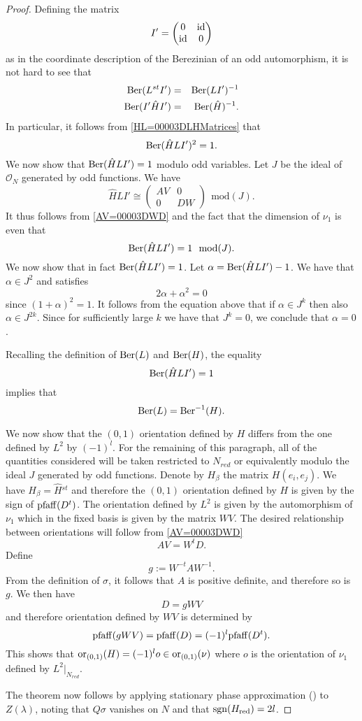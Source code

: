 \documentclass[11pt]{amsart}
\numberwithin{equation}{section}
\numberwithin{figure}{section}
\theoremstyle{plain}
\theoremstyle{definition}
\theoremstyle{remark}
\begin{document}
\begin{proof}
Defining the matrix 
\[
I'=\left(\begin{matrix}0 & \mathrm{id}\\
\mathrm{id} & 0
\end{matrix}\right)
\]
as in the coordinate description of the Berezinian of an odd automorphism,
it is not hard to see that 
\begin{eqnarray*}
\mathrm{Ber}(L{}^{st}I') & = & \mathrm{Ber}(LI')^{-1}\\
\mathrm{Ber}(I'\hat{H}I') & = & \mathrm{Ber}(\hat{H})^{-1}.
\end{eqnarray*}
In particular, it follows from \eqref{HL=00003DLHMatrices} that 
\[
\mathrm{Ber}(\hat{H}LI')^{2}=1.
\]
We now show that $\mathrm{Ber}(\hat{H}LI')=1$ modulo odd variables. Let $J$
be the ideal of $\mathcal{O}_{N}$ generated by odd functions. We
have 
\[
\hat{H}LI'\cong\left(\begin{matrix}AV & 0\\
0 & DW
\end{matrix}\right)\ \ \mbox{mod}(J).
\]
It thus follows from \eqref{AV=00003DWD} and the fact that the dimension
of $\nu_{1}$ is even that 
\[
\ber(\hat{H}LI')=1\ \ \mbox{mod}(J).
\]
We now show that in fact $\mathrm{Ber}(\hat{H}LI')=1$. Let $\alpha=\mathrm{Ber}(\hat{H}LI')-1$.
We have that $\alpha\in J^{2}$ and satisfies 
\[
2\alpha+\alpha^{2}=0
\]
since $(1+\alpha)^{2}=1$. It follows from the equation above that
if $\alpha\in J^{k}$ then also $\alpha\in J^{2k}$. Since for sufficiently
large $k$ we have that $J^{k}=0$, we conclude that $\alpha=0$. 

Recalling the definition of $\mathrm{Ber}(L)$ and $\mathrm{Ber}(H)$, the equality
\[
\mathrm{Ber}(\hat{H}LI')=1
\]
implies that 
\[
\mathrm{Ber}(L)=\mathrm{Ber}^{-1}(H).
\]


We now show that the $(0,1)$ orientation defined by $H$ differs
from the one defined by $L^{2}$ by $(-1)^{l}$. For the remaining
of this paragraph, all of the quantities considered will be taken
restricted to $N_{red}$ or equivalently modulo the ideal $J$ generated
by odd functions. Denote by $H_{\beta}$ the matrix $H(e_{i},e_{j})$.
We have $H_{\beta}=\hat{H}{}^{st}$ and therefore the $(0,1)$ orientation
defined by $H$ is given by the sign of $\mathrm{pfaff}(D^{t})$. The orientation
defined by $L^{2}$ is given by the automorphism of $\nu_{1}$ which
in the fixed basis is given by the matrix $WV$. The desired relationship
between orientations will follow from \eqref{AV=00003DWD}
\[
AV=W^{t}D.
\]
Define 
\[
g:=W^{-t}AW^{-1}.
\]
From the definition of $\sigma$, it follows that $A$ is positive
definite, and therefore so is $g$. We then have 
\[
D=gWV
\]
and therefore orientation defined by $WV$ is determined by 
\[
\mathrm{pfaff}(gWV)=\mathrm{pfaff}(D)=(-1)^{l}\mathrm{pfaff}(D^{t}).
\]
This shows that $\mathrm{or}_{(0,1)}(H)=(-1)^{l}o\in\mathrm{or}_{(0,1)}(\nu)$ where
$o$ is the orientation of $\nu_{1}$ defined by $L^{2}|_{N_{red}}$.

The theorem now follows by applying stationary phase approximation
() to $Z(\lambda)$, noting
that $Q\sigma$ vanishes on $N$ and that $\mathrm{sgn}(H_{\mathrm{red}})=2l$.


\end{proof}

\newcommand{\etalchar}[1]{$^{#1}$}
\end{document}
